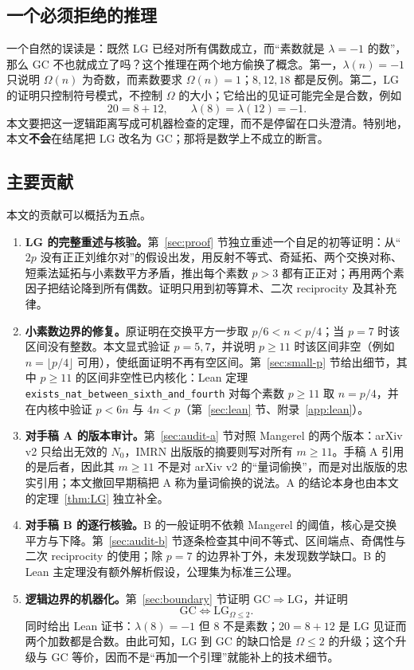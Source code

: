 \documentclass[11pt,a4paper]{ctexart}
\theoremstyle{plain}
\theoremstyle{definition}
\newcommand{\li}{\lambda}
\newcommand{\Om}{\Omega}
\newcommand{\GC}{\mathrm{GC}}
\newcommand{\LG}{\mathrm{LG}}
\newcommand{\LGtwo}{\mathrm{LG}_{\Om\le2}}
\newcommand{\code}[1]{\texttt{#1}}
\begin{document}
\subsection{一个必须拒绝的推理}
\label{sec:false-inference}

一个自然的误读是：既然 LG 已经对所有偶数成立，而“素数就是 $\li=-1$ 的数”，那么 GC 不也就成立了吗？这个推理在两个地方偷换了概念。第一，$\li(n)=-1$ 只说明 $\Om(n)$ 为奇数，而素数要求 $\Om(n)=1$；$8,12,18$ 都是反例。第二，LG 的证明只控制符号模式，不控制 $\Om$ 的大小；它给出的见证可能完全是合数，例如
\[
  20=8+12,\qquad \li(8)=\li(12)=-1.
\]
本文要把这一逻辑距离写成可机器检查的定理，而不是停留在口头澄清。特别地，本文\textbf{不会}在结尾把 LG 改名为 GC；那将是数学上不成立的断言。

\subsection{主要贡献}
\label{sec:contributions}

本文的贡献可以概括为五点。
\begin{enumerate}
\item \textbf{LG 的完整重述与核验。}第~\ref{sec:proof} 节独立重述一个自足的初等证明：从“$2p$ 没有正正刘维尔对”的假设出发，用反射不等式、奇延拓、两个交换对称、短乘法延拓与小素数平方矛盾，推出每个素数 $p>3$ 都有正正对；再用两个素因子把结论降到所有偶数。证明只用到初等算术、二次 reciprocity 及其补充律。
\item \textbf{小素数边界的修复。}原证明在交换平方一步取 $p/6<n<p/4$；当 $p=7$ 时该区间没有整数。本文显式验证 $p=5,7$，并说明 $p\ge11$ 时该区间非空（例如 $n=\lfloor p/4\rfloor$ 可用），使纸面证明不再有空区间。第~\ref{sec:small-p} 节给出细节，其中 $p\ge11$ 的区间非空性已内核化：Lean 定理 \code{exists\_nat\_between\_sixth\_and\_fourth} 对每个素数 $p\ge11$ 取 $n=p/4$，并在内核中验证 $p<6n$ 与 $4n<p$（第~\ref{sec:lean} 节、附录~\ref{app:lean}）。
\item \textbf{对手稿 A 的版本审计。}第~\ref{sec:audit-a} 节对照 Mangerel 的两个版本：arXiv v2 只给出无效的 $N_0$，IMRN 出版版的摘要则写对所有 $m\ge11$。手稿 A 引用的是后者，因此其 $m\ge11$ 不是对 arXiv v2 的“量词偷换”，而是对出版版的忠实引用；本文撤回早期稿把 A 称为量词偷换的说法。A 的结论本身也由本文的定理~\ref{thm:LG} 独立补全。
\item \textbf{对手稿 B 的逐行核验。}B 的一般证明不依赖 Mangerel 的阈值，核心是交换平方与下降。第~\ref{sec:audit-b} 节逐条检查其中间不等式、区间端点、奇偶性与二次 reciprocity 的使用；除 $p=7$ 的边界补丁外，未发现数学缺口。B 的 Lean 主定理没有额外解析假设，公理集为标准三公理。
\item \textbf{逻辑边界的机器化。}第~\ref{sec:boundary} 节证明 $\GC\Rightarrow\LG$，并证明
\[
  \GC\iff\LGtwo.
\]
同时给出 Lean 证书：$\li(8)=-1$ 但 $8$ 不是素数；$20=8+12$ 是 LG 见证而两个加数都是合数。由此可知，LG 到 GC 的缺口恰是 $\Om\le2$ 的升级；这个升级与 GC 等价，因而不是“再加一个引理”就能补上的技术细节。
\end{enumerate}
\end{document}

